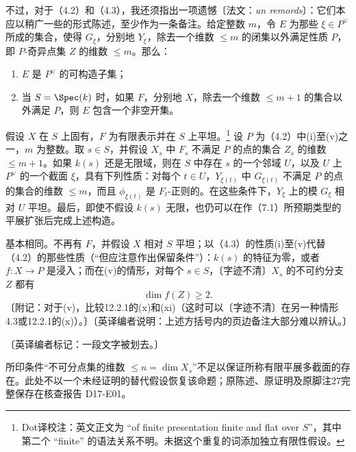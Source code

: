 不过，对于（4.2）和（4.3），我还须指出一项遗憾〔法文：\textit{un remords}〕：它们本应以稍广一些的形式陈述，至少作为一条备注。给定整数 $m$，令 $E$ 为那些 $\xi\in P^\vee$ 所成的集合，使得 $G_\xi$，分别地 $Y_\xi$，除去一个维数 $\leq m$ 的闭集以外满足性质 $P$，即 $P$-奇异点集 $Z$ 的维数 $\leq m$。那么：
\begin{enumerate}
\item[(a)] $E$ 是 $P^\vee$ 的可构造子集；
\item[(b)] 当 $S=\Spec(k)$ 时，如果 $F$，分别地 $X$，除去一个维数 $\leq m+1$ 的集合以外满足 $P$，则 $E$ 包含一个非空开集。
\end{enumerate}

假设 $X$ 在 $S$ 上固有，$F$ 为有限表示并在 $S$ 上平坦。\footnote{Dot译校注：英文正文为 ``of finite presentation finite and flat over $S$''，其中第二个 ``finite'' 的语法关系不明。未据这个重复的词添加独立有限性假设。}
设 $P$ 为（4.2）中(i)至(v)之一，$m$ 为整数。取 $s\in S$，并假设 $X_s$ 中 $F_s$ 不满足 $P$ 的点的集合 $Z_s$ 的维数 $\leq m+1$。如果 $k(s)$ 还是无限域，则在 $S$ 中存在 $s$ 的一个邻域 $U$，以及 $U$ 上 $P^\vee$ 的一个截面 $\xi$，具有下列性质：对每个 $t\in U$，$Y_{\xi(t)}$ 中 $G_{\xi(t)}$ 不满足 $P$ 的点的集合的维数 $\leq m$，而且 $\phi_{\xi(t)}$ 是 $F_t$-正则的。在这些条件下，$Y_\xi$ 上的模 $G_\xi$ 相对 $U$ 平坦。最后，即使不假设 $k(s)$ 无限，也仍可以在作（7.1）所预期类型的平展扩张后完成上述构造。

基本相同。不再有 $F$，并假设 $X$ 相对 $S$ 平坦；以（4.3）的性质(i)至(v)代替（4.2）的那些性质（“但应注意作出保留条件”）：$k(s)$ 的特征为零，或者 $f:X\to P$ 是浸入；而在(v)的情形，对每个 $s\in S$，〔字迹不清〕$X_s$ 的不可约分支 $Z$ 都有
\[
 \dim f(Z)\geq2.
\]
〔附记：对于(v)，比较12.2.1的(x)和(xi)（这时可以〔字迹不清〕在另一种情形4.3或12.2.1的(x)）。〕〔英译编者说明：上述方括号内的页边备注大部分难以辨认。〕

〔英译编者标记：一段文字被划去。〕

所印条件“不可分点集的维数 $\leq n=\dim X_s$”不足以保证所称有限平展多截面的存在。此处不以一个未经证明的替代假设恢复该命题；原陈述、原证明及原脚注27完整保存在核查报告 D17-E01。

